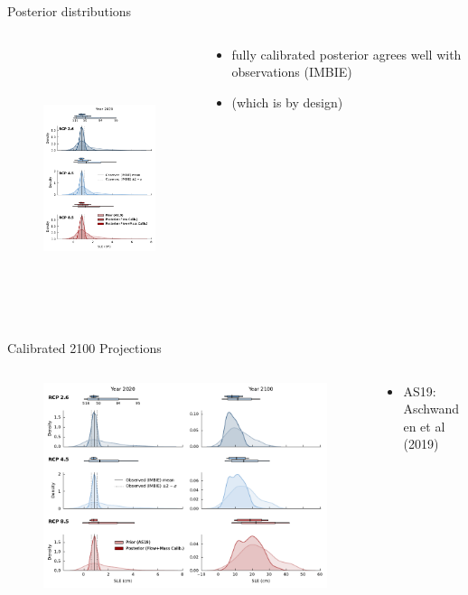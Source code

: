 \documentclass[aspectratio=169,hide notes,intlimits]{beamer}
\begin{document}
\begin{frame}{Posterior distributions}
  \begin{columns}[c]
    \begin{column}{.5\textwidth}
      \begin{figure}
        \includegraphics[height=7.75cm]{sle_pdf_w_obs_calibrated_2020.pdf}
      \end{figure}
    \end{column}
    \begin{column}{.5\textwidth}
      \begin{itemize}
      \item fully calibrated posterior agrees well with observations (IMBIE)
      \item (which is by design)
      \end{itemize}
    \end{column}
  \end{columns}
\end{frame}

\begin{frame}{Calibrated 2100 Projections}
        \begin{columns}[c]
    \begin{column}{.8\textwidth}
    \begin{figure}
      \includegraphics[height=7.cm]{sle_pdf_prior_posterior_w_obs_2020_2100}
    \end{figure}
    \end{column}
    \begin{column}{.25\textwidth}
\begin{itemize}\setlength\itemsep{.25em}
    \item AS19: Aschwanden et al (2019)
\end{itemize}
    \end{column}
  \end{columns}
\end{frame}
\end{document}
